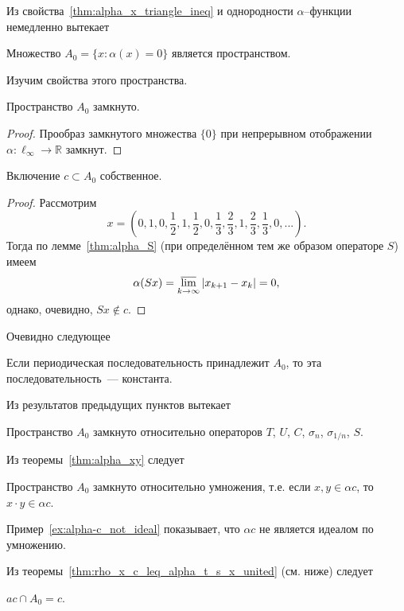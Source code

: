 Из свойства~\ref{thm:alpha_x_triangle_ineq} и однородности $\alpha$--функции немедленно вытекает
\begin{theorem}
	Множество $A_0 = \{x: \alpha(x) = 0\}$
	является пространством.
\end{theorem}
Изучим свойства этого пространства.
\begin{property}
	Пространство $A_0$ замкнуто.
\end{property}
\begin{proof}
	Прообраз замкнутого множества $\{0\}$
	при непрерывном отображении $\alpha : \ell_\infty \to \mathbb{R}$
	замкнут.
\end{proof}
\begin{theorem}
	Включение $c \subset A_0$ собственное.
\end{theorem}
\begin{proof}
	Рассмотрим
	\begin{equation}
		x=\left(
			0,1,
			0,\frac{1}{2},1,\frac{1}{2},
			0,\frac{1}{3},\frac{2}{3},1,\frac{2}{3},\frac{1}{3},
			0,
			...
		\right)
		.
	\end{equation}
	Тогда по лемме~\ref{thm:alpha_S} (при определённом тем же образом операторе $S$) имеем
	\begin{equation}
		\alpha(Sx) = \varlimsup_{k\to\infty} |x_{k+1} - x_{k}| = 0
		,
	\end{equation}
	однако, очевидно, $Sx\notin c$.
\end{proof}
Очевидно следующее
\begin{property}
	Если периодическая последовательность принадлежит $A_0$,
	то эта последовательность~--- константа.
\end{property}

Из результатов предыдущих пунктов вытекает
\begin{theorem}
	Пространство $A_0$ замкнуто относительно операторов $T$, $U$, $C$, $\sigma_n$, $\sigma_{1/n}$, $S$.
\end{theorem}

Из теоремы~\ref{thm:alpha_xy} следует
\begin{theorem}
	Пространство $A_0$ замкнуто относительно умножения,
	т.е. если $x,y\in\alpha c$, то $x\cdot y \in \alpha c$.
\end{theorem}

Пример~\ref{ex:alpha-c_not_ideal} показывает, что $\alpha c$
не является идеалом по умножению.

Из теоремы~\ref{thm:rho_x_c_leq_alpha_t_s_x_united} (см. ниже) следует
\begin{theorem}
	$ac \cap A_0 = c$.
\end{theorem}

